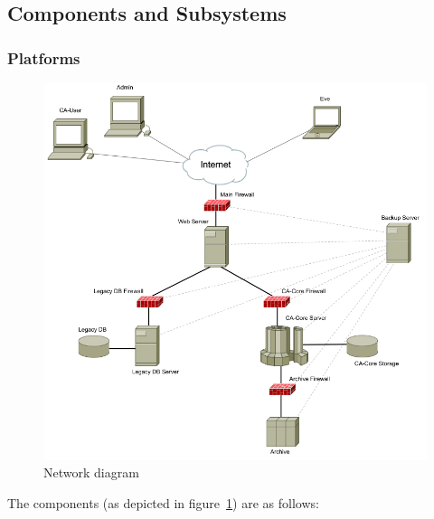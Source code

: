 \documentclass{article}
\begin{document}
\newpage
\subsection{Components and Subsystems}

\subsubsection{Platforms}

\begin{figure}[h]
\includegraphics[scale=0.5]{network_diagram}
\caption{Network diagram}
\label{fig:network_diagram}
\end{figure}

The components (as depicted in figure~\ref{fig:network_diagram}) are as follows:
\end{document}
